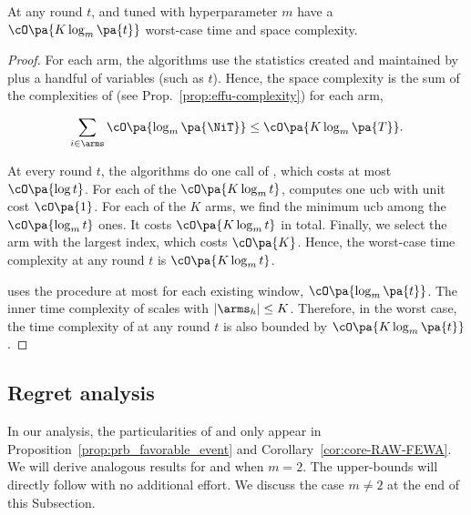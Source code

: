 \begin{proposition}
At any round $t$, \EFFFEWA and \EFFRAW tuned with hyperparameter $m$ have a $\cO\pa{K\log_m\pa{t}}$ worst-case time and space complexity.
\end{proposition}
\begin{proof}
For each arm, the algorithms use the statistics created and maintained by \EFFU plus a handful of variables (such as $t$). Hence, the space complexity is the sum of the complexities of \EFFU (see Prop.~\ref{prop:effu-complexity}) for each arm, \ie

\[ 
\sum_{i \in \arms} \cO\pa{\log_m\pa{\NiT}}\leq \cO\pa{K\log_m\pa{T}}.
\] 

At every round $t$, the algorithms do one call of \EFFU, which costs at most $\cO\pa{\log t}$. For each of the $\cO\pa{K\log_m t}$, \EFFRAW computes one ucb with unit cost $\cO\pa{1}$. For each of the $K$ arms, we find the minimum ucb among the $\cO\pa{\log_m t}$ ones. It costs $\cO\pa{K\log_m t}$ in total. Finally, we select the arm with the largest index, which costs $\cO\pa{K}$. Hence, the worst-case time complexity at any round $t$ is $\cO\pa{K\log_m t}$.

\EFFFEWA uses the procedure \FILTER  at most for each existing window, \ie $\cO\pa{\log_m\pa{t}}$. The inner time complexity of \FILTER scales with $|\arms_h| \leq K$. Therefore, in the worst case, the time complexity of \EFFFEWA at any round $t$ is also bounded by $\cO\pa{K\log_m\pa{t}}$.
\end{proof}

\subsection{Regret analysis}
In our analysis, the particularities of \RAWUCB and \FEWA only appear in Proposition~\ref{prop:prb_favorable_event} and Corollary~\ref{cor:core-RAW-FEWA}. We will derive analogous results for \EFFRAW and \EFFFEWA when $m=2$. The upper-bounds will directly follow with no additional effort. We discuss the case $m\neq 2$ at the end of this Subsection. 
